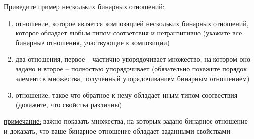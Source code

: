 \question
Приведите  пример  нескольких бинарных отношений:
\begin{enumerate}
	\renewcommand{\labelenumi}{\alph{enumi})}
	\item отношение, которое является композицией нескольких бинарных отношений,  которое  обладает любым типом соответсвия  и нетранзитивно (укажите все бинарные отношения, участвующие в композиции)
	\item два отношения, первое -- частично упорядочивает множество, на котором оно задано и второе -- полностью упорядочивает (обязательно покажите порядок элементов множества, полученный упорядочиванием бинарным отношением)
	\item отношение, такое что обратное к нему обладает иным типом соотвествия (докажите, что свойства различны)
\end{enumerate}

\underline{примечание:} важно показать  множества, на которых задано бинарное отношение и доказать, что ваше бинарное отношение обладает заданными свойствами
